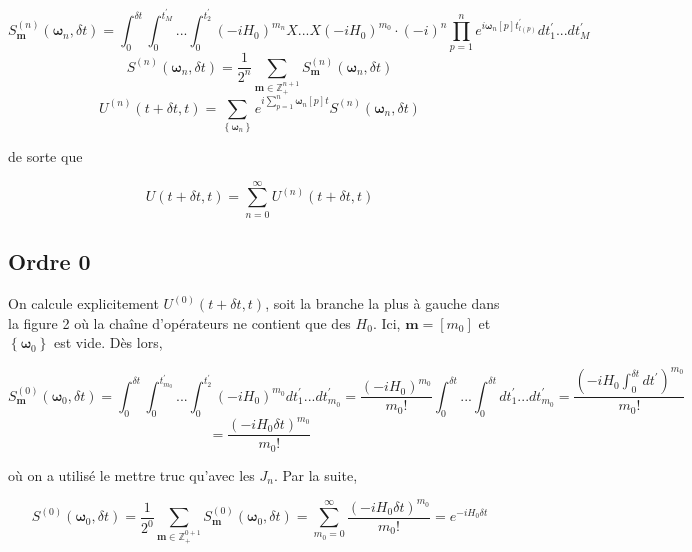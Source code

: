 \begin{equation}
    S^{(n)}_{\boldsymbol{m}}(\boldsymbol{\omega}_n, \delta t) = \int_{0}^{\delta t}\int_{0}^{t_M^{'}}...\int_{0}^{t_2^{'}} (-iH_0)^{m_n}X...X(-iH_0)^{m_0} \cdot (-i)^n \prod_{p=1}^{n}e^{i\boldsymbol{\omega}_n[p]t_{l(p)}^{'}} dt_1^{'} ... dt_M^{'}
\end{equation}
\begin{equation}
    S^{(n)}(\boldsymbol{\omega}_n, \delta t) = \frac{1}{2^n}\sum_{\boldsymbol{m} \in \mathbb{Z}^{n+1}_+} S^{(n)}_{\boldsymbol{m}}(\boldsymbol{\omega}_n, \delta t)
\end{equation}
\begin{equation}
    U^{(n)}(t + \delta t, t) = \sum_{\left\{\boldsymbol{\omega}_n\right\}}e^{i\sum_{p=1}^{n}\boldsymbol{\omega}_n[p]t}S^{(n)}(\boldsymbol{\omega}_n, \delta t)
\end{equation}

de sorte que 

\begin{equation}
    U(t+\delta t, t) = \sum_{n=0}^{\infty}U^{(n)}(t+\delta t, t)
\end{equation}

\subsection{Ordre 0}
On calcule explicitement $U^{(0)}(t+\delta t, t)$, soit la branche la plus à gauche dans la figure 2 où la chaîne d'opérateurs ne contient que des $H_0$. Ici, $\boldsymbol{m} = [m_0]$ et $\left\{\boldsymbol{\omega}_0\right\}$ est vide. Dès lors,

\begin{equation*}
    S^{(0)}_{\boldsymbol{m}}(\boldsymbol{\omega}_0, \delta t) = \int_{0}^{\delta t}\int_{0}^{t_{m_0}^{'}}...\int_{0}^{t_2^{'}} (-iH_0)^{m_0}dt_1^{'}...dt_{m_0}^{'} = \frac{(-iH_0)^{m_0}}{m_0!}\int_{0}^{\delta t}...\int_{0}^{\delta t}dt_1^{'}...dt_{m_0}^{'} = \frac{(-iH_0\int_{0}^{\delta t}dt^{'})^{m_0}}{m_0!}
\end{equation*}
\begin{equation*}
    = \frac{(-iH_0\delta t)^{m_0}}{m_0!}
\end{equation*}

où on a utilisé le mettre truc qu'avec les $J_n$. Par la suite,

\begin{equation*}
    S^{(0)}(\boldsymbol{\omega}_0, \delta t) = \frac{1}{2^0}\sum_{\boldsymbol{m} \in \mathbb{Z}^{0+1}_{+}}S^{(0)}_{\boldsymbol{m}}(\boldsymbol{\omega}_0, \delta t) = \sum_{m_0=0}^{\infty}\frac{(-iH_0\delta t)^{m_0}}{m_0!} = e^{-iH_0\delta t}
\end{equation*}

